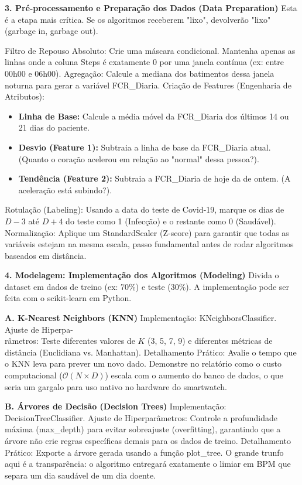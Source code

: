 \begin{description}
    \textbf{3. Pré-processamento e Preparação dos Dados (Data Preparation)}
    Esta é a etapa mais crítica. Se os algoritmos receberem "lixo", devolverão "lixo" (garbage in, garbage out).

    Filtro de Repouso Absoluto: Crie uma máscara condicional. Mantenha apenas as linhas onde a coluna Steps é exatamente 0 por uma janela contínua (ex: entre 00h00 e 06h00).
    Agregação: Calcule a mediana dos batimentos dessa janela noturna para gerar a variável FCR\_Diaria.
    Criação de Features (Engenharia de Atributos):
    \begin{itemize}
        \item \textbf{Linha de Base:} Calcule a média móvel da FCR\_Diaria dos últimos 14 ou 21 dias do paciente.
        \item \textbf{Desvio (Feature 1):} Subtraia a linha de base da FCR\_Diaria atual. (Quanto o coração acelerou em relação ao "normal" dessa pessoa?).
        \item \textbf{Tendência (Feature 2):} Subtraia a FCR\_Diaria de hoje da de ontem. (A aceleração está subindo?).
    \end{itemize}
    Rotulação (Labeling): Usando a data do teste de Covid-19, marque os dias de $D-3$ até $D+4$ do teste como 1 (Infecção) e o restante como 0 (Saudável).
    Normalização: Aplique um StandardScaler (Z-score) para garantir que todas as variáveis estejam na mesma escala, passo fundamental antes de rodar algoritmos baseados em distância.

    \textbf{4. Modelagem: Implementação dos Algoritmos (Modeling)}
    Divida o dataset em dados de treino (ex: 70\%) e teste (30\%). A implementação pode ser feita com o scikit-learn em Python.

    \textbf{A. K-Nearest Neighbors (KNN)}
    Implementação: KNeighborsClassifier.
    Ajuste de Hiperpa-\\râmetros: Teste diferentes valores de $K$ (3, 5, 7, 9) e diferentes métricas de distância (Euclidiana vs. Manhattan).
    Detalhamento Prático: Avalie o tempo que o KNN leva para prever um novo dado. Demonstre no relatório como o custo computacional ($\mathcal{O}(N \times D)$) escala com o aumento do banco de dados, o que seria um gargalo para uso nativo no hardware do smartwatch.

    \textbf{B. Árvores de Decisão (Decision Trees)}
    Implementação: DecisionTreeClassifier.
    Ajuste de Hiperparâmetros: Controle a profundidade máxima (max\_depth) para evitar sobreajuste (overfitting), garantindo que a árvore não crie regras específicas demais para os dados de treino.
    Detalhamento Prático: Exporte a árvore gerada usando a função plot\_tree. O grande trunfo aqui é a transparência: o algoritmo entregará exatamente o limiar em BPM que separa um dia saudável de um dia doente.


\end{description}

